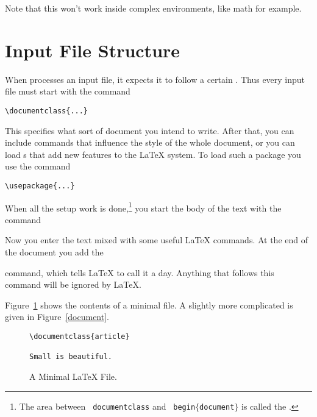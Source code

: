 Note that this won't work inside complex environments, like math for example.

\section{Input File Structure}

When \LaTeXe{} processes an input file, it expects it to follow a
certain . Thus every input file must start with the
command
\begin{code}
\verb|\documentclass{...}|
\end{code}
This specifies what sort of document you intend to write. After that,
you can include commands that influence the style of the whole
document, or you can load s that add new
features to the \LaTeX{} system. To load such a package you use the
command
\begin{code}
\verb|\usepackage{...}|
\end{code}

When all the setup work is done,\footnote{The area between \texttt{\bs
    documentclass} and \texttt{\bs
    begin$\mathtt{\{}$document$\mathtt{\}}$} is called the
  \emph{}.} you start the body of the text with the
command

\begin{code}
\verb||
\end{code}

Now you enter the text mixed with some useful \LaTeX{} commands.  At
the end of the document you add the
\begin{code}
\verb||
\end{code}
command, which tells \LaTeX{} to call it a day. Anything that
follows this command will be ignored by \LaTeX.

Figure~\ref{mini} shows the contents of a minimal \LaTeXe{} file. A
slightly more complicated  is given in
Figure~\ref{document}.

\begin{figure}[!bp]
\begin{lined}{6cm}
\begin{verbatim}
\documentclass{article}

Small is beautiful.

\end{verbatim}
\end{lined}
\caption{A Minimal \LaTeX{} File.} \label{mini}
\end{figure}
 
